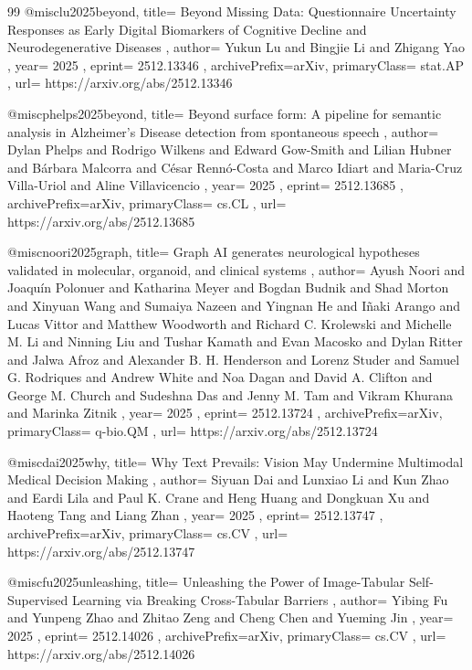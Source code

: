 \documentclass[11pt,a4paper]{article}
\begin{document}
\begin{thebibliography}{99}
@misc{lu2025beyond,
  title={ Beyond Missing Data: Questionnaire Uncertainty Responses as Early Digital Biomarkers of Cognitive Decline and Neurodegenerative Diseases },
  author={ Yukun Lu and Bingjie Li and Zhigang Yao },
  year={ 2025 },
  eprint={ 2512.13346 },
  archivePrefix={arXiv},
  primaryClass={ stat.AP },
  url={ https://arxiv.org/abs/2512.13346 }
}


@misc{phelps2025beyond,
  title={ Beyond surface form: A pipeline for semantic analysis in Alzheimer's Disease detection from spontaneous speech },
  author={ Dylan Phelps and Rodrigo Wilkens and Edward Gow-Smith and Lilian Hubner and Bárbara Malcorra and César Rennó-Costa and Marco Idiart and Maria-Cruz Villa-Uriol and Aline Villavicencio },
  year={ 2025 },
  eprint={ 2512.13685 },
  archivePrefix={arXiv},
  primaryClass={ cs.CL },
  url={ https://arxiv.org/abs/2512.13685 }
}


@misc{noori2025graph,
  title={ Graph AI generates neurological hypotheses validated in molecular, organoid, and clinical systems },
  author={ Ayush Noori and Joaquín Polonuer and Katharina Meyer and Bogdan Budnik and Shad Morton and Xinyuan Wang and Sumaiya Nazeen and Yingnan He and Iñaki Arango and Lucas Vittor and Matthew Woodworth and Richard C. Krolewski and Michelle M. Li and Ninning Liu and Tushar Kamath and Evan Macosko and Dylan Ritter and Jalwa Afroz and Alexander B. H. Henderson and Lorenz Studer and Samuel G. Rodriques and Andrew White and Noa Dagan and David A. Clifton and George M. Church and Sudeshna Das and Jenny M. Tam and Vikram Khurana and Marinka Zitnik },
  year={ 2025 },
  eprint={ 2512.13724 },
  archivePrefix={arXiv},
  primaryClass={ q-bio.QM },
  url={ https://arxiv.org/abs/2512.13724 }
}


@misc{dai2025why,
  title={ Why Text Prevails: Vision May Undermine Multimodal Medical Decision Making },
  author={ Siyuan Dai and Lunxiao Li and Kun Zhao and Eardi Lila and Paul K. Crane and Heng Huang and Dongkuan Xu and Haoteng Tang and Liang Zhan },
  year={ 2025 },
  eprint={ 2512.13747 },
  archivePrefix={arXiv},
  primaryClass={ cs.CV },
  url={ https://arxiv.org/abs/2512.13747 }
}


@misc{fu2025unleashing,
  title={ Unleashing the Power of Image-Tabular Self-Supervised Learning via Breaking Cross-Tabular Barriers },
  author={ Yibing Fu and Yunpeng Zhao and Zhitao Zeng and Cheng Chen and Yueming Jin },
  year={ 2025 },
  eprint={ 2512.14026 },
  archivePrefix={arXiv},
  primaryClass={ cs.CV },
  url={ https://arxiv.org/abs/2512.14026 }
}



\end{thebibliography}
\end{document}
